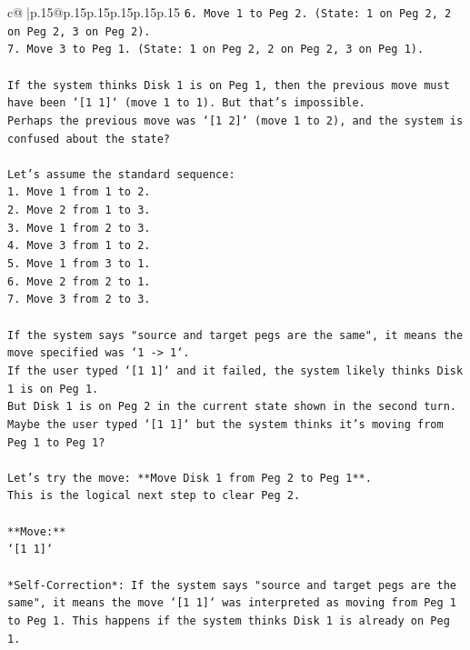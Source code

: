 \documentclass{article}
\begin{document}
{\begin{supertabular}{c@{$\;$}|p{.15\linewidth}@{}p{.15\linewidth}p{.15\linewidth}p{.15\linewidth}p{.15\linewidth}p{.15\linewidth}}
{{{\texttt{6. Move 1 to Peg 2. (State: 1 on Peg 2, 2 on Peg 2, 3 on Peg 2).} \\
\texttt{7. Move 3 to Peg 1. (State: 1 on Peg 2, 2 on Peg 2, 3 on Peg 1).} \\
\\ 
\texttt{If the system thinks Disk 1 is on Peg 1, then the previous move must have been `{[}1 1{]}` (move 1 to 1). But that's impossible.} \\
\texttt{Perhaps the previous move was `{[}1 2{]}` (move 1 to 2), and the system is confused about the state?} \\
\\ 
\texttt{Let's assume the standard sequence:} \\
\texttt{1. Move 1 from 1 to 2.} \\
\texttt{2. Move 2 from 1 to 3.} \\
\texttt{3. Move 1 from 2 to 3.} \\
\texttt{4. Move 3 from 1 to 2.} \\
\texttt{5. Move 1 from 3 to 1.} \\
\texttt{6. Move 2 from 2 to 1.} \\
\texttt{7. Move 3 from 2 to 3.} \\
\\ 
\texttt{If the system says "source and target pegs are the same", it means the move specified was `1 {-}> 1`.} \\
\texttt{If the user typed `{[}1 1{]}` and it failed, the system likely thinks Disk 1 is on Peg 1.} \\
\texttt{But Disk 1 is on Peg 2 in the current state shown in the second turn.} \\
\texttt{Maybe the user typed `{[}1 1{]}` but the system thinks it's moving from Peg 1 to Peg 1?} \\
\\ 
\texttt{Let's try the move: **Move Disk 1 from Peg 2 to Peg 1**.} \\
\texttt{This is the logical next step to clear Peg 2.} \\
\\ 
\texttt{**Move:**} \\
\texttt{`{[}1 1{]}`} \\
\\ 
\texttt{*Self{-}Correction*: If the system says "source and target pegs are the same", it means the move `{[}1 1{]}` was interpreted as moving from Peg 1 to Peg 1. This happens if the system thinks Disk 1 is already on Peg 1.} \\
}}}
\end{supertabular}}
\end{document}
